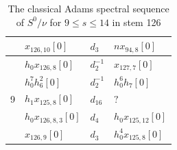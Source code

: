 \documentclass{amsart}
\numberwithin{equation}{section}
\newcommand{\makebibliography}{
    \newpage
    
    
}
\newcommand{\TitleCellColor}{\cellcolor{black!10}}
\begin{document}
\begin{table}
{\begin{tabular}{|c|l|l|l|}
 & $x_{126,10}[0]$ & $d_{3}$ & $nx_{94,8}[0]$ \\\hline\hline
\multirow{5}{*}{9} & $h_0x_{126,8}[0]$ & $d_{2}^{-1}$ & $x_{127,7}[0]$ \\\cline{2-4}
 & $h_0^7h_6^2[0]$ & $d_{2}^{-1}$ & $h_0^6h_7[0]$ \\\cline{2-4}
 & $h_1x_{125,8}[0]$ & $d_{16}$ & $?$ \\\cline{2-4}
 & $h_0x_{126,8,3}[0]$ & $d_{4}$ & $h_0x_{125,12}[0]$ \\\cline{2-4}
 & $x_{126,9}[0]$ & $d_{3}$ & $h_0^4x_{125,8}[0]$ \\\hline %
\end{tabular}}
\caption{The classical Adams spectral sequence of $S^0/\nu$ for $9 \le s \le 14$ in stem 126}
\label{Table:Cnu126}
\end{table}


\makebibliography
\end{document}
